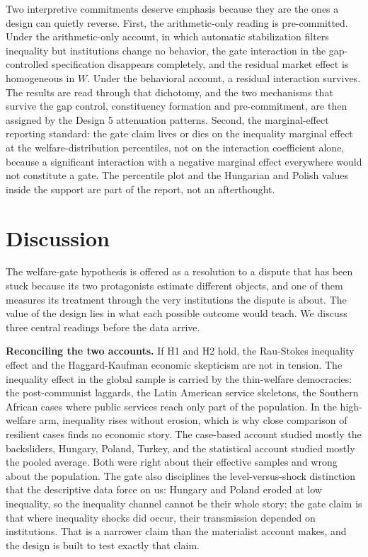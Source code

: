 \documentclass[11pt,letterpaper]{article}
\begin{document}
Two interpretive commitments deserve emphasis because they are the ones a design can quietly reverse. First, the arithmetic-only reading is pre-committed. Under the arithmetic-only account, in which automatic stabilization filters inequality but institutions change no behavior, the gate interaction in the gap-controlled specification disappears completely, and the residual market effect is homogeneous in $W$. Under the behavioral account, a residual interaction survives. The results are read through that dichotomy, and the two mechanisms that survive the gap control, constituency formation and pre-commitment, are then assigned by the Design 5 attenuation patterns. Second, the marginal-effect reporting standard: the gate claim lives or dies on the inequality marginal effect at the welfare-distribution percentiles, not on the interaction coefficient alone, because a significant interaction with a negative marginal effect everywhere would not constitute a gate. The percentile plot and the Hungarian and Polish values inside the support are part of the report, not an afterthought.

\section{Discussion}

The welfare-gate hypothesis is offered as a resolution to a dispute that has been stuck because its two protagonists estimate different objects, and one of them measures its treatment through the very institutions the dispute is about. The value of the design lies in what each possible outcome would teach. We discuss three central readings before the data arrive.

\textbf{Reconciling the two accounts.} If H1 and H2 hold, the Rau-Stokes inequality effect \citep{RauStokes2025} and the Haggard-Kaufman economic skepticism \citep{HaggardKaufman2021} are not in tension. The inequality effect in the global sample is carried by the thin-welfare democracies: the post-communist laggards, the Latin American service skeletons, the Southern African cases where public services reach only part of the population. In the high-welfare arm, inequality rises without erosion, which is why close comparison of resilient cases finds no economic story. The case-based account studied mostly the backsliders, Hungary, Poland, Turkey, and the statistical account studied mostly the pooled average. Both were right about their effective samples and wrong about the population. The gate also disciplines the level-versus-shock distinction that the descriptive data force on us: Hungary and Poland eroded at low inequality, so the inequality channel cannot be their whole story; the gate claim is that where inequality shocks did occur, their transmission depended on institutions. That is a narrower claim than the materialist account makes, and the design is built to test exactly that claim.
\end{document}
